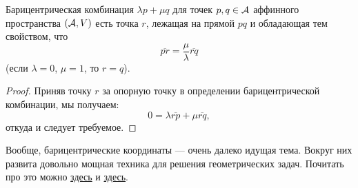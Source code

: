 \begin{proposal}
    Барицентрическая комбинация $\lambda p + \mu q$ для точек $p, q \in \mathcal{A}$ аффинного пространства $(\mathcal{A}, V)$ есть точка $r$, лежащая на прямой $pq$ и обладающая тем свойством, что
    \[
        \overline{pr} = \frac{\mu}{\lambda}\overline{rq}
    \]
    (если $\lambda = 0$, $\mu = 1$, то $r = q$).
\end{proposal}

\begin{proof}
    Приняв точку $r$ за опорную точку в определении барицентрической комбинации, мы получаем:
    \[
        0 = \lambda\overline{rp} + \mu\overline{rq},
    \]
    откуда и следует требуемое.
\end{proof}

Вообще, барицентрические координаты --- очень далеко идущая тема. Вокруг них развита довольно мощная техника для решения геометрических задач. Почитать про это можно \href{https://old.mccme.ru//mmmf-lectures//books/books/book.40.pdf}{здесь} и \href{https://web.evanchen.cc/handouts/bary/bary-full.pdf}{здесь}.

